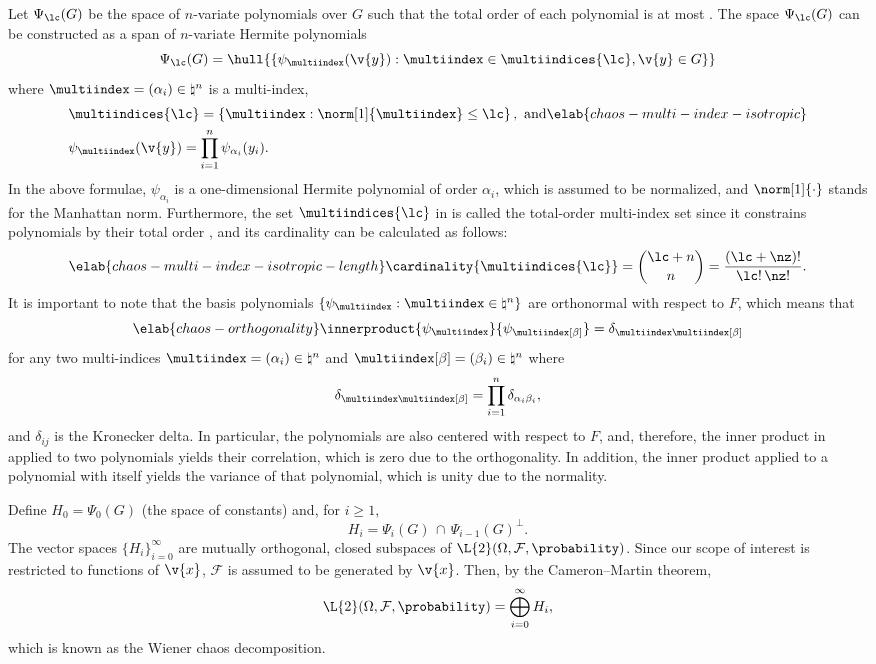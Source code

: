 Let $\Psi_\lc(G)$ be the space of $n$-variate polynomials over $G$ such that the
total order of each polynomial is at most \lc. The space $\Psi_\lc(G)$ can be
constructed as a span of $n$-variate Hermite polynomials \cite{eldred2008,
maitre2010}
\[
  \Psi_\lc(G) = \hull{\left\{ \psi_{\multiindex}(\v{y}): \multiindex \in \multiindices{\lc}, \v{y} \in G \right\}}
\]
where $\multiindex = (\alpha_i) \in \natural^n$ is a multi-index,
\begin{align}
  & \multiindices{\lc} = \left\{ \multiindex: \norm[1]{\multiindex} \leq \lc \right\}, \text{ and} \elab{chaos-multi-index-isotropic} \\
  & \psi_{\multiindex}(\v{y}) = \prod_{i = 1}^n \psi_{\alpha_i}(y_i). \nonumber
\end{align}
In the above formulae, $\psi_{\alpha_i}$ is a one-dimensional Hermite polynomial
of order $\alpha_i$, which is assumed to be normalized, and $\norm[1]{\cdot}$
stands for the Manhattan norm. Furthermore, the set $\multiindices{\lc}$ in
 is called the total-order multi-index set
since it constrains polynomials by their total order \cite{eldred2008,
beck2011}, and its cardinality can be calculated as follows:
\begin{equation} \elab{chaos-multi-index-isotropic-length}
  \cardinality{\multiindices{\lc}} = {\lc + n \choose n} = \frac{(\lc + \nz)!}{\lc! \, \nz!}.
\end{equation}
It is important to note that the basis polynomials $\{ \psi_{\multiindex}:
\multiindex \in \natural^n \}$ are orthonormal with respect to $F$, which means
that
\begin{equation} \elab{chaos-orthogonality}
  \innerproduct{\psi_{\multiindex}}{\psi_{\multiindex[\beta]}} = \delta_{\multiindex \multiindex[\beta]}
\end{equation}
for any two multi-indices $\multiindex = (\alpha_i) \in \natural^n$ and
$\multiindex[\beta] = (\beta_i) \in \natural^n$ where
\[
  \delta_{\multiindex \multiindex[\beta]} = \prod_{i = 1}^n \delta_{\alpha_i \beta_i},
\]
and $\delta_{ij}$ is the Kronecker delta. In particular, the polynomials are
also centered with respect to $F$, and, therefore, the inner product in
 applied to two polynomials yields their correlation,
which is zero due to the orthogonality. In addition, the inner product applied
to a polynomial with itself yields the variance of that polynomial, which is
unity due to the normality.

Define $H_0 = \Psi_0(G)$ (the space of constants) and, for $i \geq 1$,
\[
  H_i = \Psi_i(G) \, \cap \, \Psi_{i - 1}(G)^\perp.
\]
The vector spaces $\{ H_i \}_{i = 0}^\infty$ are mutually orthogonal, closed
subspaces of $\L{2}(\Omega, \mathcal{F}, \probability)$. Since our scope of
interest is restricted to functions of $\v{x}$, $\mathcal{F}$ is assumed to be
generated by $\v{x}$. Then, by the Cameron--Martin theorem,
\[
  \L{2}(\Omega, \mathcal{F}, \probability) = \bigoplus_{i = 0}^\infty H_i,
\]
which is known as the Wiener chaos decomposition.

